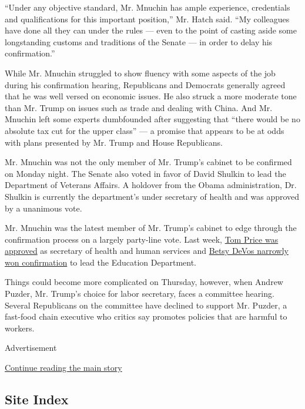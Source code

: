 ``Under any objective standard, Mr. Mnuchin has ample experience,
credentials and qualifications for this important position,'' Mr. Hatch
said. ``My colleagues have done all they can under the rules --- even to
the point of casting aside some longstanding customs and traditions of
the Senate --- in order to delay his confirmation.''

While Mr. Mnuchin struggled to show fluency with some aspects of the job
during his confirmation hearing, Republicans and Democrats generally
agreed that he was well versed on economic issues. He also struck a more
moderate tone than Mr. Trump on issues such as trade and dealing with
China. And Mr. Mnuchin left some experts dumbfounded after suggesting
that ``there would be no absolute tax cut for the upper class'' --- a
promise that appears to be at odds with plans presented by Mr. Trump and
House Republicans.

Mr. Mnuchin was not the only member of Mr. Trump's cabinet to be
confirmed on Monday night. The Senate also voted in favor of David
Shulkin to lead the Department of Veterans Affairs. A holdover from the
Obama administration, Dr. Shulkin is currently the department's under
secretary of health and was approved by a unanimous vote.

Mr. Mnuchin was the latest member of Mr. Trump's cabinet to edge through
the confirmation process on a largely party-line vote. Last week,
\href{https://www.nytimes.com/2017/02/10/us/politics/tom-price-health-and-human-services.html}{Tom
Price was approved} as secretary of health and human services and
\href{https://www.nytimes.com/2017/02/07/us/politics/betsy-devos-education-secretary-confirmed.html}{Betsy
DeVos narrowly won confirmation} to lead the Education Department.

Things could become more complicated on Thursday, however, when Andrew
Puzder, Mr. Trump's choice for labor secretary, faces a committee
hearing. Several Republicans on the committee have declined to support
Mr. Puzder, a fast-food chain executive who critics say promotes
policies that are harmful to workers.

Advertisement

\protect\hyperlink{after-bottom}{Continue reading the main story}

\hypertarget{site-index}{%
\subsection{Site Index}\label{site-index}}

